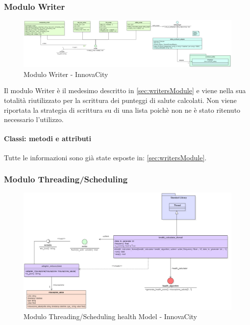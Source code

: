 \subsubsection{Modulo Writer}
\begin{figure}[H]
    \centering
    \includegraphics[width=1\textwidth]{../Images/SpecificaTecnica/writerModule.PNG}
    \caption{Modulo Writer - InnovaCity}
    \label{fig: healthModelloWriter}
\end{figure}
Il modulo Writer è il medesimo descritto in \ref*{sec:writersModule} e viene nella sua totalità riutilizzato per la scrittura dei punteggi di salute calcolati.
Non viene riportata la strategia di scrittura su di una lista poichè non ne è stato ritenuto necessario l'utilizzo.

\paragraph*{Classi: metodi e attributi}
Tutte le informazioni sono già state esposte in: \ref*{sec:writersModule}.

\subsubsection{Modulo Threading/Scheduling}
\begin{figure}[H]
    \centering
    \includegraphics[width=1\textwidth]{../Images/SpecificaTecnica/healthThreading.PNG}
    \caption{Modulo Threading/Scheduling health Model - InnovaCity}
    \label{fig: threadHealth}
\end{figure}

